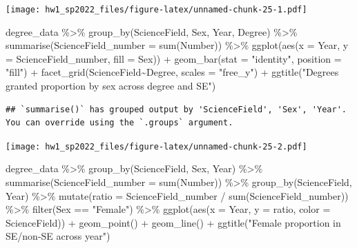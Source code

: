 \documentclass[
]{article}
\newenvironment{Shaded}{\begin{snugshade}}{\end{snugshade}}
\newcommand{\AttributeTok}[1]{\textcolor[rgb]{0.77,0.63,0.00}{#1}}
\newcommand{\FunctionTok}[1]{\textcolor[rgb]{0.00,0.00,0.00}{#1}}
\newcommand{\NormalTok}[1]{#1}
\newcommand{\SpecialCharTok}[1]{\textcolor[rgb]{0.00,0.00,0.00}{#1}}
\newcommand{\StringTok}[1]{\textcolor[rgb]{0.31,0.60,0.02}{#1}}
\begin{document}
\texttt{[image: hw1\_sp2022\_files/figure-latex/unnamed-chunk-25-1.pdf]}

\begin{Shaded}
\begin{Highlighting}[]
\NormalTok{degree\_data }\SpecialCharTok{\%\textgreater{}\%}
  \FunctionTok{group\_by}\NormalTok{(ScienceField, Sex, Year, Degree) }\SpecialCharTok{\%\textgreater{}\%}
  \FunctionTok{summarise}\NormalTok{(}\AttributeTok{ScienceField\_number =} \FunctionTok{sum}\NormalTok{(Number)) }\SpecialCharTok{\%\textgreater{}\%}
  \FunctionTok{ggplot}\NormalTok{(}\FunctionTok{aes}\NormalTok{(}\AttributeTok{x =}\NormalTok{ Year, }\AttributeTok{y =}\NormalTok{ ScienceField\_number, }\AttributeTok{fill =}\NormalTok{ Sex)) }\SpecialCharTok{+}
  \FunctionTok{geom\_bar}\NormalTok{(}\AttributeTok{stat =} \StringTok{"identity"}\NormalTok{, }\AttributeTok{position =} \StringTok{"fill"}\NormalTok{) }\SpecialCharTok{+}
  \FunctionTok{facet\_grid}\NormalTok{(ScienceField}\SpecialCharTok{\textasciitilde{}}\NormalTok{Degree, }\AttributeTok{scales =} \StringTok{"free\_y"}\NormalTok{) }\SpecialCharTok{+}
  \FunctionTok{ggtitle}\NormalTok{(}\StringTok{"Degrees granted proportion by sex across degree and SE"}\NormalTok{)}
\end{Highlighting}
\end{Shaded}

\begin{verbatim}
## `summarise()` has grouped output by 'ScienceField', 'Sex', 'Year'. You can override using the `.groups` argument.
\end{verbatim}

\texttt{[image: hw1\_sp2022\_files/figure-latex/unnamed-chunk-25-2.pdf]}

\begin{Shaded}
\begin{Highlighting}[]
\NormalTok{degree\_data }\SpecialCharTok{\%\textgreater{}\%}
  \FunctionTok{group\_by}\NormalTok{(ScienceField, Sex, Year) }\SpecialCharTok{\%\textgreater{}\%}
  \FunctionTok{summarise}\NormalTok{(}\AttributeTok{ScienceField\_number =} \FunctionTok{sum}\NormalTok{(Number)) }\SpecialCharTok{\%\textgreater{}\%}
  \FunctionTok{group\_by}\NormalTok{(ScienceField, Year) }\SpecialCharTok{\%\textgreater{}\%}
  \FunctionTok{mutate}\NormalTok{(}\AttributeTok{ratio =}\NormalTok{ ScienceField\_number }\SpecialCharTok{/} \FunctionTok{sum}\NormalTok{(ScienceField\_number)) }\SpecialCharTok{\%\textgreater{}\%}
  \FunctionTok{filter}\NormalTok{(Sex }\SpecialCharTok{==} \StringTok{"Female"}\NormalTok{) }\SpecialCharTok{\%\textgreater{}\%}
  \FunctionTok{ggplot}\NormalTok{(}\FunctionTok{aes}\NormalTok{(}\AttributeTok{x =}\NormalTok{ Year, }\AttributeTok{y =}\NormalTok{ ratio, }\AttributeTok{color =}\NormalTok{ ScienceField)) }\SpecialCharTok{+}
  \FunctionTok{geom\_point}\NormalTok{() }\SpecialCharTok{+} \FunctionTok{geom\_line}\NormalTok{() }\SpecialCharTok{+}
  \FunctionTok{ggtitle}\NormalTok{(}\StringTok{"Female proportion in SE/non{-}SE across year"}\NormalTok{)}
\end{Highlighting}
\end{Shaded}
\end{document}
